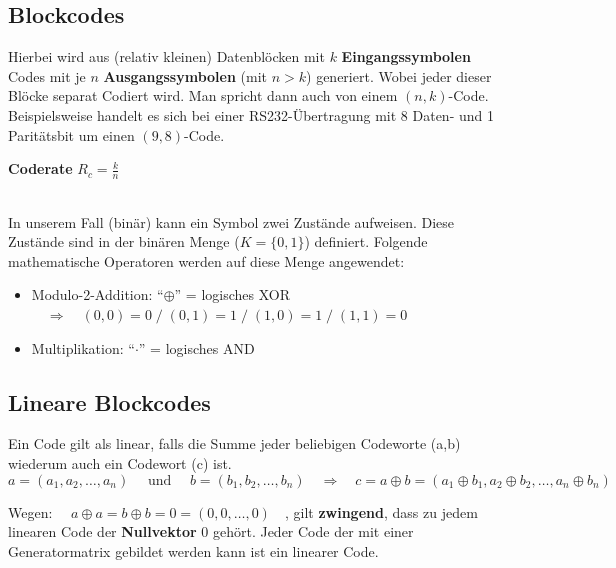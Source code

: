 \subsection{Blockcodes}
Hierbei wird aus (relativ kleinen) Datenblöcken mit \boldmath$k$ \textbf{Eingangssymbolen} Codes mit
je $n$ \unboldmath \textbf{Ausgangssymbolen} (mit $n > k$) generiert. Wobei jeder dieser Blöcke
separat Codiert wird. Man spricht dann auch von einem $(n,k)$-Code. Beispielsweise handelt es
sich bei einer RS232-Übertragung mit 8 Daten- und 1 Paritätsbit um einen $(9,8)$-Code. \\
\hspace*{0.5cm} \parbox[c][1cm]{5cm}{\textbf{Coderate} $R_c = \frac{k}{n}$}\\
In unserem Fall (binär) kann ein Symbol zwei Zustände aufweisen. Diese Zustände sind in der binären
Menge ($K=\{0,1\}$) definiert.
Folgende mathematische Operatoren werden auf diese Menge angewendet:
\begin{itemize}
  \item Modulo-2-Addition: ``$\oplus$'' = logisches XOR $\quad\Rightarrow
  \quad(0,0)=0\;/\;(0,1)=1\;/\;(1,0)=1\;/\;(1,1)=0$
  \item Multiplikation: ``$\cdot$'' = logisches AND
\end{itemize}


\subsection{Lineare Blockcodes }
Ein Code gilt als linear, falls die Summe jeder beliebigen Codeworte (a,b) wiederum auch ein
Codewort (c) ist. 
$$a = (a_1, a_2, \ldots, a_n) \quad \text{ und } \quad b = (b_1, b_2, \ldots, b_n) \quad
\Longrightarrow \quad c = a \oplus b = (a_1 \oplus b_1, a_2 \oplus b_2, \ldots, a_n \oplus b_n)$$

Wegen: $\quad a \oplus a = b \oplus b = 0 = (0,0,\ldots,0) \quad$, gilt \textbf{zwingend}, dass
zu jedem linearen Code der \textbf{Nullvektor} $0$ gehört. Jeder Code der mit einer Generatormatrix
gebildet werden kann ist ein linearer Code.

